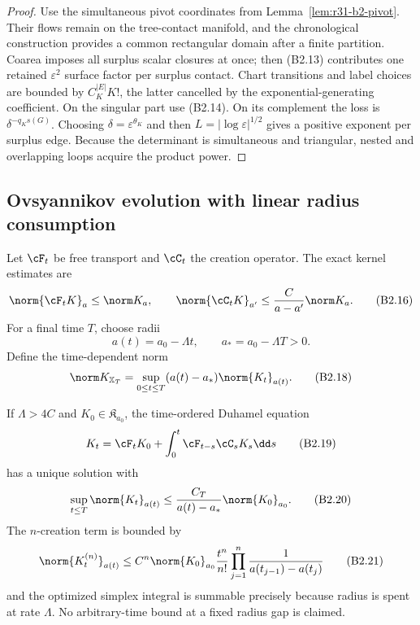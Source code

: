 \begin{proof}
Use the simultaneous pivot coordinates from
Lemma~\ref{lem:r31-b2-pivot}.  Their flows remain on the tree-contact manifold,
and the chronological construction provides a common rectangular domain
after a finite partition.  Coarea imposes all surplus scalar closures at once;
then (B2.13) contributes one retained $\varepsilon^2$ surface factor per
surplus contact.  Chart transitions and label choices are bounded by
$C_K^{|E|}K!$, the latter cancelled by the exponential-generating coefficient.
On the singular part use (B2.14).  On its complement the loss is
$\delta^{-q_Ks(G)}$.  Choosing
$\delta=\varepsilon^{\theta_K}$ and then $L=|\log\varepsilon|^{1/2}$ gives a
positive exponent per surplus edge.  Because the determinant is simultaneous
and triangular, nested and overlapping loops acquire the product power.
\end{proof}

\subsection{Ovsyannikov evolution with linear radius consumption}

Let $\cF_t$ be free transport and $\cC_t$ the creation operator.  The exact
kernel estimates are
\[
 \norm{\cF_tK}_a\le\norm K_a,\qquad
 \norm{\cC_tK}_{a'}\le{C\over a-a'}\norm K_a.             \tag{B2.16}
\]
For a final time $T$, choose radii
\[
 a(t)=a_0-\Lambda t,\qquad a_*=a_0-\Lambda T>0.           \tag{B2.17}
\]
Define the time-dependent norm
\[
 \norm K_{\mathbb X_T}
 =\sup_{0\le t\le T}(a(t)-a_*)
   \norm{K_t}_{a(t)}.                                     \tag{B2.18}
\]

\begin{theorem}
\label{thm:r31-b2-ovsyannikov}
If $\Lambda>4C$ and $K_0\in\mathfrak K_{a_0}$, the time-ordered Duhamel
equation
\[
 K_t=\cF_tK_0+
 \int_0^t\cF_{t-s}\cC_sK_s\dd s                         \tag{B2.19}
\]
has a unique solution with
\[
 \sup_{t\le T}\norm{K_t}_{a(t)}
 \le {C_T\over a(t)-a_*}\norm{K_0}_{a_0}.                \tag{B2.20}
\]
The $n$-creation term is bounded by
\[
 \norm{K_t^{(n)}}_{a(t)}
 \le C^n\norm{K_0}_{a_0}
 {t^n\over n!}
 \prod_{j=1}^n{1\over a(t_{j-1})-a(t_j)}                 \tag{B2.21}
\]
and the optimized simplex integral is summable precisely because radius is
spent at rate $\Lambda$.  No arbitrary-time bound at a fixed radius gap is
claimed.
\end{theorem}

